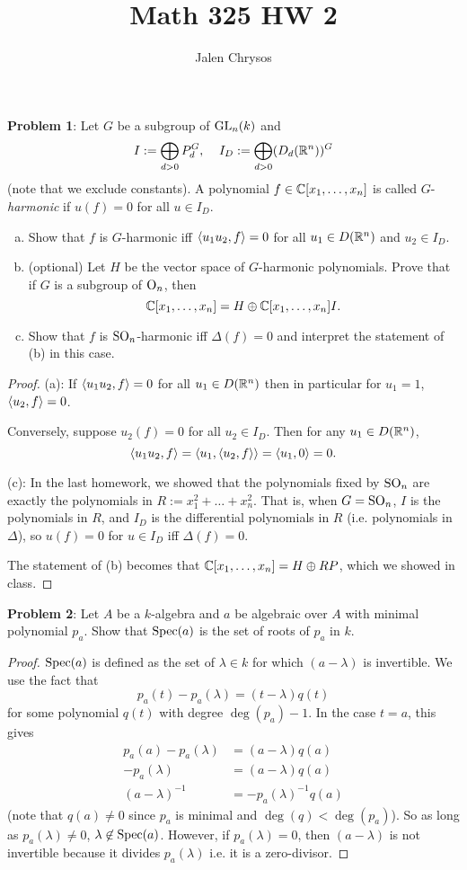 \documentclass{amsart}
\title{Math 325 HW 2}
\author{Jalen Chrysos}
\begin{document}
\maketitle	
	
\noindent\textbf{Problem 1}: Let $G$ be a subgroup of $\operatorname{GL}_n(k)$ and 
	$$
	I := \bigoplus_{d>0} P_d^G, \;\;\;\; I_D := \bigoplus_{d>0} (D_d(\mathbb{R}^n))^G
	$$
	(note that we exclude constants). A polynomial $f\in \mathbb{C}[x_1,\dots,x_n]$ is called $G$-\textit{harmonic} if $u(f)=0$ for all $u\in I_D$.
	\begin{enumerate}[(a)]
		\item Show that $f$ is $G$-harmonic iff $\langle u_1u_2,f\rangle=0$ for all $u_1\in D(\mathbb{R}^n)$ and $u_2\in I_D$.
		\item (optional) Let $H$ be the vector space of $G$-harmonic polynomials. Prove that if $G$ is a subgroup of $\mathrm{O}_n$, then 
		$$
		\mathbb{C}[x_1,\dots,x_n] = H\oplus \mathbb{C}[x_1,\dots,x_n]I.
		$$
		\item Show that $f$ is $\operatorname{SO}_n$-harmonic iff $\Delta(f)=0$ and interpret the statement of (b) in this case.
	\end{enumerate}
	
	\begin{proof}
		(a): If $\langle u_1u_2,f\rangle=0$ for all $u_1\in D(\mathbb{R}^n)$ then in particular for $u_1=1$, $\langle u_2,f\rangle=0$.
		
		Conversely, suppose $u_2(f)=0$ for all $u_2\in I_D$. Then for any $u_1\in D(\mathbb{R}^n)$, 
		$$\langle u_1u_2,f\rangle = \langle u_1,\langle u_2,f\rangle\rangle = \langle u_1,0\rangle=0.$$
		
		(c):  In the last homework, we showed that the polynomials fixed by $\operatorname{SO}_n$ are exactly the polynomials in $R:=x_1^2+\dots+x_n^2$. That is, when $G=\operatorname{SO}_n$, $I$ is the polynomials in $R$, and $I_D$ is the differential polynomials in $R$ (i.e. polynomials in $\Delta$), so $u(f)=0$ for $u\in I_D$ iff $\Delta(f)=0$. 
		
		The statement of (b) becomes that $\mathbb{C}[x_1,\dots,x_n] = H \oplus RP$, which we showed in class.
	\end{proof}
	
\newpage 

\noindent\textbf{Problem 2}: Let $A$ be a $k$-algebra and $a$ be algebraic over $A$ with minimal polynomial $p_a$. Show that $\operatorname{Spec}(a)$ is the set of roots of $p_a$ in $k$. 

\begin{proof}
	$\operatorname{Spec}(a)$ is defined as the set of $\lambda \in k$ for which $(a-\lambda)$ is invertible. We use the fact that 
	$$
	p_a(t) - p_a(\lambda) = (t-\lambda)q(t)
	$$
	for some polynomial $q(t)$ with degree $\deg(p_a)-1$. In the case $t=a$, this gives
	\begin{align*}
	p_a(a) - p_a(\lambda) &= (a-\lambda)q(a) \\
	 -p_a(\lambda) &= (a-\lambda)q(a)\\
	 (a-\lambda)^{-1} &= -p_a(\lambda)^{-1}q(a)
	\end{align*}
	(note that $q(a)\neq 0$ since $p_a$ is minimal and $\deg(q)<\deg(p_a)$). So as long as $p_a(\lambda)\neq 0$, $\lambda \not\in \operatorname{Spec}(a)$. However, if $p_a(\lambda)=0$, then $(a-\lambda)$ is not invertible because it divides $p_a(\lambda)$ i.e. it is a zero-divisor.
\end{proof}
\end{document}
